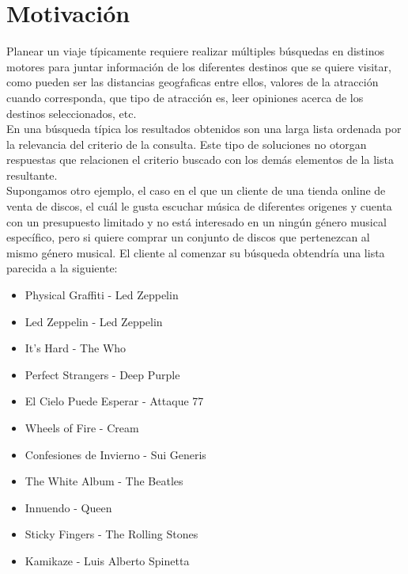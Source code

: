 \section{Motivación}
Planear un viaje típicamente requiere realizar múltiples búsquedas en distinos motores para juntar información de los diferentes destinos que se quiere visitar, como pueden ser las distancias geogŕaficas entre ellos, valores de la atracción cuando corresponda, que tipo de atracción es, leer opiniones acerca de los destinos seleccionados, etc.\\
En una búsqueda típica los resultados obtenidos son una larga lista ordenada por la relevancia del criterio de la consulta. Este tipo de soluciones no otorgan respuestas que relacionen el criterio buscado con los demás elementos de la lista resultante.\\
Supongamos otro ejemplo, el caso en el que un cliente de una tienda online de venta de discos, el cuál le gusta escuchar música de diferentes origenes y cuenta con un presupuesto limitado y no está interesado en un ningún género musical específico, pero si quiere comprar un conjunto de discos que pertenezcan al mismo género musical. El cliente al comenzar su búsqueda obtendría una lista parecida a la siguiente:
\begin{itemize}
  \item Physical Graffiti - Led Zeppelin
  \item Led Zeppelin - Led Zeppelin
  \item It's Hard - The Who
  \item Perfect Strangers - Deep Purple
  \item El Cielo Puede Esperar - Attaque 77
  \item Wheels of Fire - Cream
  \item Confesiones de Invierno - Sui Generis
  \item The White Album - The Beatles
  \item Innuendo - Queen
  \item Sticky Fingers - The Rolling Stones
  \item Kamikaze - Luis Alberto Spinetta
\end{itemize}

